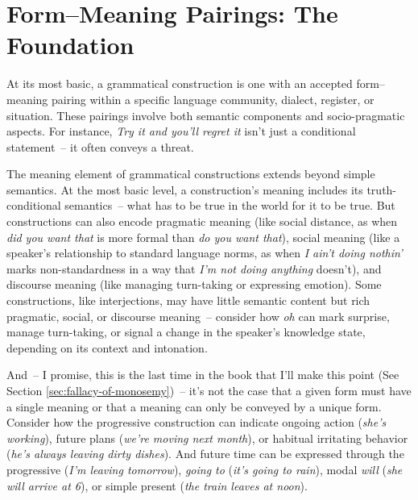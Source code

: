\section{Form--Meaning Pairings: The Foundation}

At its most basic, a grammatical construction is one with an accepted form--meaning pairing within a specific language community, dialect, register, or situation. These pairings involve both semantic components and socio-pragmatic aspects. For instance, \textit{Try it and you'll regret it} isn't just a conditional statement~-- it often conveys a threat.

The meaning element of grammatical constructions extends beyond simple semantics. At the most basic level, a construction's meaning includes its truth-conditional semantics~-- what has to be true in the world for it to be true. But constructions can also encode pragmatic meaning (like social distance, as when \textit{did you want that} is more formal than \textit{do you want that}), social meaning (like a speaker's relationship to standard language norms, as when \textit{I ain't doing nothin'} marks non-standardness in a way that \textit{I'm not doing anything} doesn't), and discourse meaning (like managing turn-taking or expressing emotion). Some constructions, like interjections, may have little semantic content but rich pragmatic, social, or discourse meaning~-- consider how \textit{oh} can mark surprise, manage turn-taking, or signal a change in the speaker's knowledge state, depending on its context and intonation.

And~-- I promise, this is the last time in the book that I'll make this point (See Section \ref{sec:fallacy-of-monosemy})~-- it's not the case that a given form must have a single meaning or that a meaning can only be conveyed by a unique form. Consider how the progressive construction can indicate ongoing action (\textit{she's working}), future plans (\textit{we're moving next month}), or habitual irritating behavior (\textit{he's always leaving dirty dishes}). And future time can be expressed through the progressive (\textit{I'm leaving tomorrow}), \textit{going to} (\textit{it's going to rain}), modal \textit{will} (\textit{she will arrive at 6}), or simple present (\textit{the train leaves at noon}).

